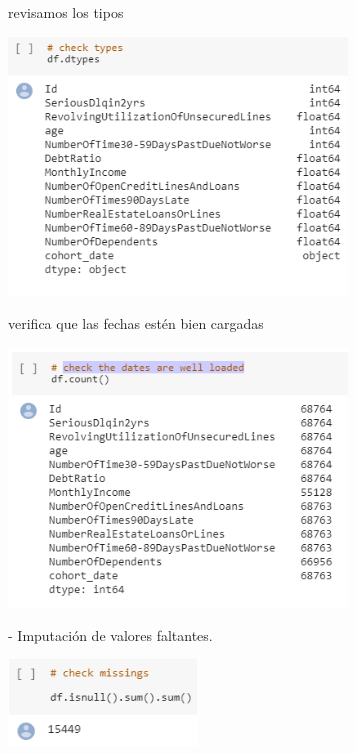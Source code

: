 \documentclass[12pt,letterpaper]{article}
\begin{document}
revisamos los tipos

\begin{center}
\includegraphics[width=9cm]{IMG/4.png} 
\end{center}


verifica que las fechas est\'en bien cargadas

\begin{center}
\includegraphics[width=9cm]{IMG/5.png} 
\end{center}


- Imputaci\'on de valores faltantes.

\begin{center}
\includegraphics[width=5cm]{IMG/6.png} 
\end{center}
\end{document}
